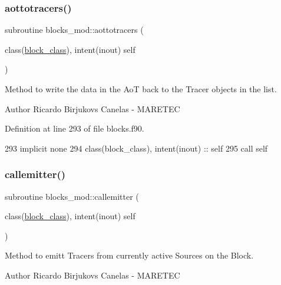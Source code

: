 \subsubsection{\texorpdfstring{aottotracers()}{aottotracers()}}
{\footnotesize\ttfamily subroutine blocks\+\_\+mod\+::aottotracers (\begin{DoxyParamCaption}\item[{class(\mbox{\hyperlink{structblocks__mod_1_1block__class}{block\+\_\+class}}), intent(inout)}]{self }\end{DoxyParamCaption})\hspace{0.3cm}{\ttfamily [private]}}



Method to write the data in the AoT back to the Tracer objects in the list. 

\begin{DoxyAuthor}{Author}
Ricardo Birjukovs Canelas -\/ M\+A\+R\+E\+T\+EC 
\end{DoxyAuthor}


Definition at line 293 of file blocks.\+f90.


\begin{DoxyCode}
293     \textcolor{keywordtype}{implicit none}
294     \textcolor{keywordtype}{class}(block\_class), \textcolor{keywordtype}{intent(inout)} :: self
295     \textcolor{keyword}{call }self%
\end{DoxyCode}
\mbox{\label{namespaceblocks__mod_a2c3cf5113e1422d812c2c869afde2729}} 
\subsubsection{\texorpdfstring{callemitter()}{callemitter()}}
{\footnotesize\ttfamily subroutine blocks\+\_\+mod\+::callemitter (\begin{DoxyParamCaption}\item[{class(\mbox{\hyperlink{structblocks__mod_1_1block__class}{block\+\_\+class}}), intent(inout)}]{self }\end{DoxyParamCaption})\hspace{0.3cm}{\ttfamily [private]}}



Method to emitt Tracers from currently active Sources on the Block. 

\begin{DoxyAuthor}{Author}
Ricardo Birjukovs Canelas -\/ M\+A\+R\+E\+T\+EC 
\end{DoxyAuthor}


